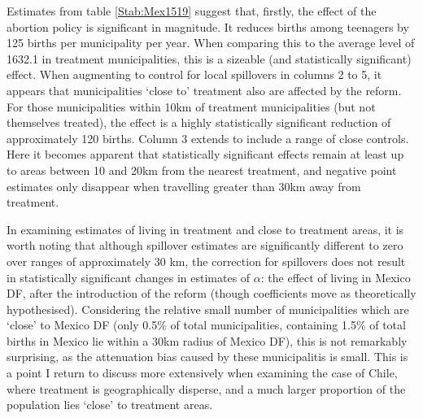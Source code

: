 

Estimates from table \ref{Stab:Mex1519} suggest that, firstly, the effect of
the abortion policy is significant in magnitude.  It reduces births among 
teenagers by 125 births per municipality per year. When comparing this to the
average level of 1632.1 in treatment municipalities, this is a sizeable (and
statistically significant) effect.  When augmenting to control for local
spillovers in columns 2 to 5, it appears that municipalities `close to' 
treatment also are affected by the reform.  For those municipalities within
10km of treatment municipalities (but not themselves treated), the effect is 
a highly statistically significant reduction of approximately 120 births.
Column 3 extends to include a range of close controls.  Here it becomes
apparent that statistically significant effects remain at least up to areas
between 10 and 20km from the nearest treatment, and negative point estimates
only disappear when travelling greater than 30km away from treatment.  

In examining estimates of living in treatment and close to treatment areas, it 
is worth noting that although spillover estimates are significantly different
to zero over ranges of approximately 30 km, the correction for spillovers
does not result in statistically significant changes in estimates of $\alpha$:
the effect of living in Mexico DF, after the introduction of the reform 
(though coefficients move as theoretically hypothesised).  Considering the
relative small number of municipalities which are `close' to Mexico DF (only
0.5\% of total municipalities, containing 1.5\% of total births in Mexico lie 
within a 30km radius of Mexico DF), this is not remarkably surprising, as the 
attenuation bias caused by these municipalitis is small. This is a point I 
return to discuss more extensively when examining the case of Chile, where 
treatment is geographically disperse, and a much larger proportion of the 
population lies `close' to treatment areas.

